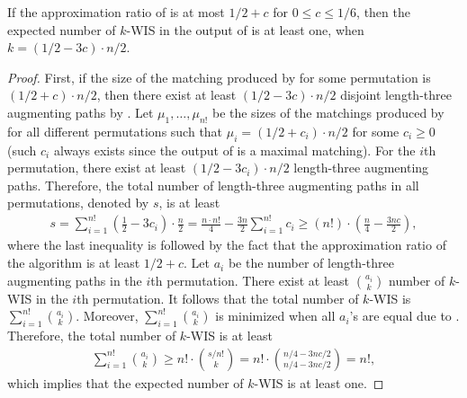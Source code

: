 \begin{lemma}\label{lem:kltap-all-perms}
    If the approximation ratio of \rnk{} is at most $1/2 + c$ for $0 \leq c \leq 1/6$, then the expected number of $k$-WIS in the output of \rnk{} is at least one, when $k = (1/2 - 3c) \cdot n/2$.
\end{lemma}
\begin{proof}
    First, if the size of the matching produced by \rnk{} for some permutation is $(1/2 + c) \cdot n/2$, then there exist at least $(1/2 - 3c)\cdot n/2$ disjoint length-three augmenting paths by . Let $\mu_1, \ldots, \mu_{n!}$ be the sizes of the matchings produced by \rnk{} for all different permutations such that $\mu_i = (1/2 + c_i)\cdot n/2$ for some $c_i \geq 0$ (such $c_i$ always exists since the output of \rnk{} is a maximal matching). For the $i$th permutation, there exist at least $(1/2 - 3c_i)\cdot n/2$ length-three augmenting paths. Therefore, the total number of length-three augmenting paths in all permutations, denoted by $s$, is at least
    \begin{align*}
        s = \sum_{i=1}^{n!} (\frac{1}{2} - 3c_i)\cdot \frac{n}{2} = \frac{n \cdot n!}{4} - \frac{3n}{2} \sum_{i=1}^{n!} c_i   \geq
        (n!) \cdot \left( \frac{n}{4} - \frac{3nc}{2}\right),
    \end{align*}
    where the last inequality is followed by the fact that the approximation ratio of the algorithm is at least $1/2 + c$. Let $a_i$ be the number of length-three augmenting paths in the $i$th permutation. There exist at least ${ a_i \choose k}$ number of $k$-WIS in the $i$th permutation. It follows that the total number of $k$-WIS is $\sum_{i=1}^{n!} {a_i \choose k}$. Moreover, $\sum_{i=1}^{n!} {a_i \choose k}$ is minimized when all $a_i$'s are equal due to . Therefore, the total number of $k$-WIS is at least
    \begin{align*}
        \sum_{i=1}^{n!} {a_i \choose k} \geq n! \cdot {s/n! \choose k} = n! \cdot {n/4 - 3nc/2 \choose n/4 - 3nc/2} = n!,
    \end{align*}
    which implies that the expected number of $k$-WIS is at least one.
\end{proof}



